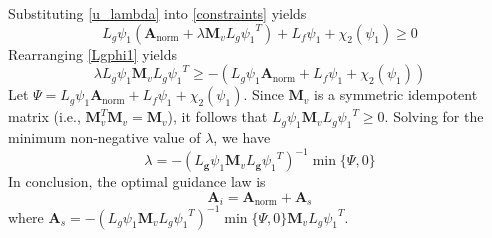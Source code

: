\documentclass[lettersize,journal]{IEEEtran}
\begin{document}
Substituting \eqref{u_lambda} into \eqref{constraints} yields
\begin{equation}
	\label{Lgphi1}
	L_{{g}}{\psi _1} \left({\boldsymbol{A}}_{\mathrm{norm}} + \lambda {\boldsymbol{M}}_v L_{{g}}{\psi _1}^T\right) + L_{{f}}{\psi _1} + {\chi _2}({\psi _1}) \ge 0
\end{equation}
Rearranging \eqref{Lgphi1} yields
\begin{equation}
	\lambda L_{{g}}{\psi _1} {\boldsymbol{M}}_v L_{{g}}{\psi _1}^T \ge -\left(L_{{g}}{\psi _1} {\boldsymbol{A}}_{\mathrm{norm}} + L_{{f}}{\psi _1} + {\chi _2}({\psi _1})\right)
\end{equation}
Let $\Psi = L_{{g}}{\psi _1} {\boldsymbol{A}}_{\mathrm{norm}} + L_{{f}}{\psi _1} + {\chi _2}({\psi _1})$. Since ${\boldsymbol{M}}_v$ is a symmetric idempotent matrix (i.e., ${\boldsymbol{M}}_v^T {\boldsymbol{M}}_v = {\boldsymbol{M}}_v$), it follows that $L_{{g}}{\psi _1} {\boldsymbol{M}}_v L_{{g}}{\psi _1}^T \ge 0$. Solving for the minimum non-negative value of $\lambda$, we have
\begin{equation}
	\lambda = -\left(L_{\boldsymbol{g}}{\psi _1} {\boldsymbol{M}}_v L_{\boldsymbol{g}}{\psi _1}^T\right)^{-1} \min\{\Psi, 0\}
\end{equation}
In conclusion, the optimal guidance law is
\begin{equation}
	{\boldsymbol{A}}_i = {\boldsymbol{A}}_{\mathrm{norm}} + {\boldsymbol{A}}_s
\end{equation}
where ${\boldsymbol{A}}_s = -(L_{{g}}{\psi _1} {\boldsymbol{M}}_v L_{{g}}{\psi _1}^T)^{-1} \min\{\Psi, 0\} {\boldsymbol{M}}_v L_{{g}}{\psi _1}^T$.
\end{document}
